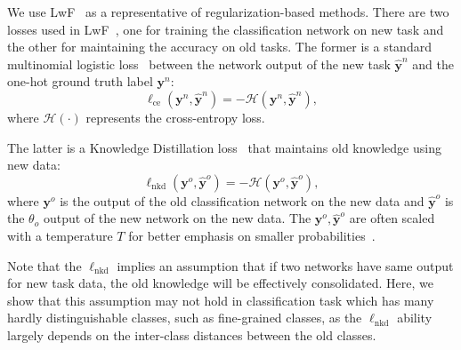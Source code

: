 \documentclass[10pt,twocolumn,letterpaper]{article}
\begin{document}
We use LwF~\cite{li2017learning} as a representative of regularization-based methods. There are two losses used in LwF~\cite{li2017learning}, one for training the classification network on new task and the other for maintaining the accuracy on old tasks. The former is a standard multinomial logistic loss~\cite{krizhevsky2012imagenet} between the network output of the new task $\hat{\mathbf{y}}^{n}$ and the one-hot ground truth label $\mathbf{y}^{n}$:
\begin{equation}
    \ell_{\text{ce}}(\mathbf{y}^{n},\hat{\mathbf{y}}^{n} ) = -\mathcal{H}(\mathbf{y}^{n}, \hat{\mathbf{y}}^{n}),
\end{equation}
where $\mathcal{H}(\cdot)$ represents the cross-entropy loss.

The latter is a Knowledge Distillation loss~\cite{hinton2015distilling} that maintains old knowledge using new data:
\begin{equation}
    \ell_{\text{nkd}}(\mathbf{y}^{o},\hat{\mathbf{y}}^{o} ) = -\mathcal{H}(\mathbf{y}^{ o},\hat{\mathbf{y}}^{o}),
\end{equation}
where $\mathbf{y}^{o}$ is the output of the old classification network on the new data and $\hat{\mathbf{y}}^{o}$ is the $\theta_{o}$ output of the new network on the new data. The $\mathbf{y}^{o}, \hat{\mathbf{y}}^{o}$ are often scaled with a temperature $T$ for better emphasis on smaller probabilities~\cite{li2017learning}.

Note that the $\ell_{\text{nkd}}$ implies an assumption that if two networks have same output for new task data, the old knowledge will be effectively consolidated. Here, we show that this assumption may not hold in classification task which has many hardly distinguishable classes, such as fine-grained classes, as the $\ell_{\text{nkd}}$ ability largely depends on the inter-class distances between the old classes. 
\end{document}
